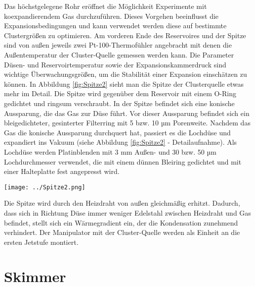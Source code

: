 Das höchstgelegene Rohr eröffnet die Möglichkeit Experimente mit koexpandierendem Gas durchzuführen. Dieses Vorgehen beeinflusst die Expansionsbedingungen und kann verwendet werden diese auf bestimmte Clustergrößen zu optimieren. Am vorderen Ende des Reservoires und der Spitze sind von außen jeweils zwei Pt-100-Thermofühler angebracht mit denen die Außentemperatur der Cluster-Quelle gemessen werden kann. Die Parameter Düsen- und Reservoirtemperatur sowie der Expansionskammerdruck sind wichtige Überwachungsgrößen, um die Stabilität einer Expansion einschätzen zu können. In Abbildung \ref{fig:Spitze2} sieht man die Spitze der Clusterquelle etwas mehr im Detail. Die Spitze wird gegenüber dem Reservoir mit einem O-Ring gedichtet und ringsum verschraubt. In der Spitze befindet sich eine konische Aussparung, die das Gas zur Düse führt. Vor dieser Aussparung befindet sich ein bleigedichteter, gesinterter Filterring mit 5 bzw. 10 µm Porenweite. Nachdem das Gas die konische Aussparung durchquert hat, passiert es die Lochdüse und expandiert ins Vakuum (siehe Abbildung \ref{fig:Spitze2} - Detailaufnahme). Als Lochdüse werden Platinblenden mit 3 mm Außen- und 30 bzw. 50 µm Lochdurchmesser verwendet, die mit einem dünnen Bleiring gedichtet und mit einer Halteplatte fest angepresst wird. %

\begin{center} 
\begin{minipage}{\linewidth}
\texttt{[image: ../Spitze2.png]}%
  \label{fig:Spitze2}
\end{minipage} 
\end{center} 

Die Spitze wird durch den Heizdraht von außen gleichmäßig erhitzt. Dadurch, dass sich in Richtung Düse immer weniger Edelstahl zwischen Heizdraht und Gas befindet, stellt sich ein Wärmegradient ein, der die Kondensation zunehmend verhindert. Der Manipulator mit der Cluster-Quelle werden als Einheit an die ersten Jetstufe montiert. \\
%
%



\section{Skimmer} \label{sec:Skimmer}


